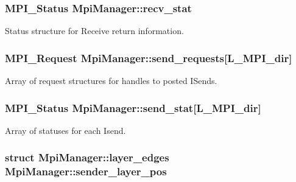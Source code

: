 \subsubsection[{\texorpdfstring{recv\+\_\+stat}{recv_stat}}]{\setlength{\rightskip}{0pt plus 5cm}M\+P\+I\+\_\+\+Status Mpi\+Manager\+::recv\+\_\+stat}\hypertarget{class_mpi_manager_a257bc27e8099f1cbf5ac70b80d8eadaa}{}\label{class_mpi_manager_a257bc27e8099f1cbf5ac70b80d8eadaa}


Status structure for Receive return information. 

\subsubsection[{\texorpdfstring{send\+\_\+requests}{send_requests}}]{\setlength{\rightskip}{0pt plus 5cm}M\+P\+I\+\_\+\+Request Mpi\+Manager\+::send\+\_\+requests\mbox{[}{\bf L\+\_\+\+M\+P\+I\+\_\+dir}\mbox{]}}\hypertarget{class_mpi_manager_af096663b094d919caba62d4bdf8e7d88}{}\label{class_mpi_manager_af096663b094d919caba62d4bdf8e7d88}


Array of request structures for handles to posted I\+Sends. 

\subsubsection[{\texorpdfstring{send\+\_\+stat}{send_stat}}]{\setlength{\rightskip}{0pt plus 5cm}M\+P\+I\+\_\+\+Status Mpi\+Manager\+::send\+\_\+stat\mbox{[}{\bf L\+\_\+\+M\+P\+I\+\_\+dir}\mbox{]}}\hypertarget{class_mpi_manager_ab129fdffa1925677841f25bcd4507b5e}{}\label{class_mpi_manager_ab129fdffa1925677841f25bcd4507b5e}


Array of statuses for each Isend. 

\subsubsection[{\texorpdfstring{sender\+\_\+layer\+\_\+pos}{sender_layer_pos}}]{\setlength{\rightskip}{0pt plus 5cm}struct {\bf Mpi\+Manager\+::layer\+\_\+edges}  Mpi\+Manager\+::sender\+\_\+layer\+\_\+pos}\hypertarget{class_mpi_manager_a7201074f50eab0d0d667394e04a7cf24}{}\label{class_mpi_manager_a7201074f50eab0d0d667394e04a7cf24}
